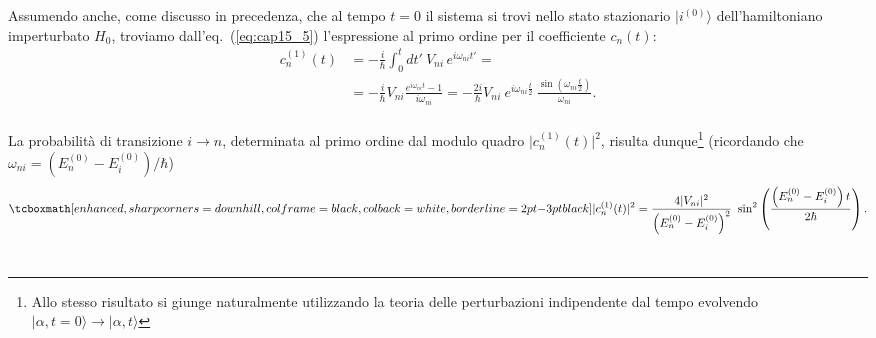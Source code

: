 Assumendo anche, come discusso in precedenza, che al tempo $t=0$ il sistema si trovi nello stato stazionario $\vert i^{(0)}\rangle $ dell'hamiltoniano imperturbato $H_0$, troviamo dall'eq.~(\ref{eq:cap15_5}) l'espressione al primo ordine per il coefficiente $c_n (t)$:
	\begin{align}
		c_n ^{(1)} (t) & =  -\frac{i}{\hbar} \int _0 ^t dt'\ V_{ni}\, e^{i \omega _{ni} t'} = \nonumber \\
		&= -\frac{i}{\hbar} V_{ni} \frac{e^{i \omega _{ni} t}-1}{i \omega _{ni}}= -\frac{2i}{\hbar} V_{ni}\ e^{i \omega _{ni} \frac{t}{2}}\ \frac{\sin{\left(\omega _{ni} \frac{t}{2}\right)}}{\omega _{ni}} .
	\end{align}\\
	
La probabilità di transizione $i\rightarrow n $, determinata al primo ordine dal modulo quadro $\vert c_n ^{(1)} (t) \vert ^2$, risulta dunque\footnote{Allo stesso risultato si giunge naturalmente utilizzando la teoria delle perturbazioni indipendente dal tempo evolvendo $ \vert \alpha , t =0 \rangle \rightarrow \vert \alpha , t \rangle$} (ricordando che $\omega _{ni} = ( E_n ^{(0)}- E_i ^{(0)})/ \hbar$)
	\begin{equation}
		\tcboxmath[enhanced, sharp corners=downhill, colframe=black, colback=white, borderline={2pt}{-3pt}{black}]{
			\vert c_n ^{(1)} (t) \vert ^2 = \frac{4\vert V_{ni} \vert ^2}{\left( E_n ^{(0)} - E_i ^{(0)} \right) ^2}\ \sin ^2\left(\frac{\left( E_n ^{(0)} - E_i ^{(0)} \right) t}{2 \hbar}\right).
			}
	\label{eq:cap15_6}
	\end{equation}\\
	
